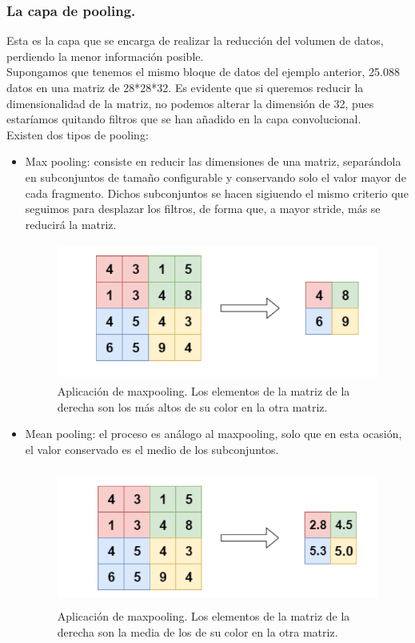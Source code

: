 \documentclass[a4paper,11pt]{article}
\begin{document}
\subsubsection{La capa de pooling.}
Esta es la capa que se encarga de realizar la reducción del volumen de datos, perdiendo la menor información posible.\\ Supongamos que tenemos el mismo bloque de datos del ejemplo anterior, 25.088 datos en una matriz de 28*28*32. Es evidente que si queremos reducir la dimensionalidad de la matriz, no podemos alterar la dimensión de 32, pues estaríamos quitando filtros que se han añadido en la capa convolucional.\\

\noindent
Existen dos tipos de pooling:
\begin{itemize}
\item Max pooling: consiste en reducir las dimensiones de una matriz, separándola en subconjuntos de tamaño configurable y conservando solo el valor mayor de cada fragmento. Dichos subconjuntos se hacen sigiuendo el mismo criterio que seguimos para desplazar los filtros, de forma que, a mayor stride, más se reducirá la matriz.
\begin{figure}[H]
\centering
\includegraphics[width=11.0cm, height=4.5cm]{maxpool.png}
\caption{Aplicación de maxpooling. Los elementos de la matriz de la derecha son los más altos de su color en la otra matriz.}
\end{figure}
\item Mean pooling: el proceso es análogo al maxpooling, solo que en esta ocasión, el valor conservado es el medio de los subconjuntos.
\begin{figure}[H]
\centering
\includegraphics[width=11.0cm, height=4.5cm]{meanpool.png}
\caption{Aplicación de maxpooling. Los elementos de la matriz de la derecha son la media de los de su color en la otra matriz.}
\end{figure}
\end{itemize}
\end{document}
